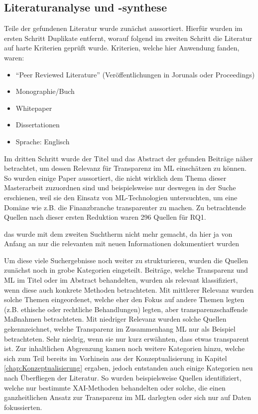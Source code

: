 \subsection{Literaturanalyse und -synthese}
Teile der gefundenen Literatur wurde zunächst aussortiert. Hierfür wurden im ersten Schritt Duplikate entfernt, worauf folgend im zweiten Schritt die Literatur auf harte Kriterien geprüft wurde. Kriterien, welche hier Anwendung fanden, waren:
\begin{itemize}
    \item \enquote{Peer Reviewed Literature} (Veröffentlichungen in Jorunals oder Proceedings)
    \item Monographie/Buch
    \item Whitepaper
    \item Dissertationen
    \item Sprache: Englisch
\end{itemize}
Im dritten Schritt wurde der Titel und das Abstract der gefunden Beiträge näher betrachtet, um dessen Relevanz für Transparenz im ML einschätzen zu können. So wurden einige Paper aussortiert, die nicht wirklich dem Thema dieser Masterarbeit zuzuordnen sind und beispielsweise nur deswegen in der Suche erschienen, weil sie den Einsatz von ML-Technologien untersuchten, um eine Domäne wie z.B. die Finanzbranche transparenter zu machen. Zu betrachtende Quellen nach dieser ersten Reduktion waren 296 Quellen für RQ1.

das wurde mit dem zweiten Suchtherm nicht mehr gemacht, da hier ja von Anfang an nur die relevanten mit neuen Informationen dokumentiert wurden

Um diese viele Suchergebnisse noch weiter zu strukturieren, wurden die Quellen zunächst noch in grobe Kategorien eingeteilt. Beiträge, welche Transparenz und ML im Titel oder im Abstract behandelten, wurden als relevant klassifiziert, wenn diese auch konkrete Methoden betrachteten. Mit mittlerer Relevanz wurden solche Themen eingeordenet, welche eher den Fokus auf andere Themen legten (z.B. ethische oder rechtliche Behandlungen) legten, aber transparenzschaffende Maßnahmen betrachteten. Mit niedriger Relevanz wurden solche Quellen gekennzeichnet, welche Transparenz im Zusammenhang ML nur als Beispiel betrachteten. Sehr niedrig, wenn sie nur kurz erwähnten, dass etwas transparent ist. Zur inhaltlichen Abgrenzung kamen noch weitere Kategorien hinzu, welche sich zum Teil bereits im Vorhinein aus der Konzeptualisierung in Kapitel \ref{chap:Konzeptualisierung} ergaben, jedoch entstanden auch einige Kategorien neu nach Überfliegen der Literatur. So wurden beispielsweise Quellen identifiziert, welche nur bestimmte XAI-Methoden behandelten oder solche, die einen ganzheitlichen Ansatz zur Transparenz im ML darlegten oder sich nur auf Daten fokussierten.


